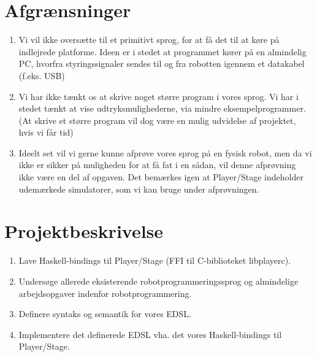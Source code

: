 \documentclass[a4paper,oneside, draft]{memoir}
\begin{document}
\section{Afgrænsninger}
\begin{enumerate}
\item Vi vil ikke oversætte til et primitivt sprog, for at få det til at køre på
  indlejrede platforme. Ideen er i stedet at programmet kører på en almindelig
  PC, hvorfra styringssignaler sendes til og fra robotten igennem et datakabel
  (f.eks. USB)
%
\item Vi har ikke tænkt os at skrive noget større program i vores sprog. Vi har
  i stedet tænkt at vise udtryksmulighederne, via mindre eksempelprogrammer. (At
  skrive et større program vil dog være en mulig udvidelse af projektet, hvis vi
  får tid)
\item Ideelt set vil vi gerne kunne afprøve vores sprog på en fysisk robot, men
  da vi ikke er sikker på muligheden for at få fat i en sådan, vil denne
  afprøvning ikke være en del af opgaven. Det bemærkes igen at Player/Stage
  indeholder udemærkede simulatorer, som vi kan bruge under afprøvningen.
\end{enumerate}

\section{Projektbeskrivelse}

\begin{enumerate}
\item Lave Haskell-bindings til Player/Stage (FFI til C-biblioteket libplayerc).
\item Undersøge allerede eksisterende robotprogrammeringssprog og
  almindelige arbejdsopgaver indenfor robotprogrammering.
\item Definere syntaks og semantik for vores EDSL.
\item Implementere det definerede EDSL vha. det vores Haskell-bindings
  til Player/Stage.
\end{enumerate}
\end{document}
